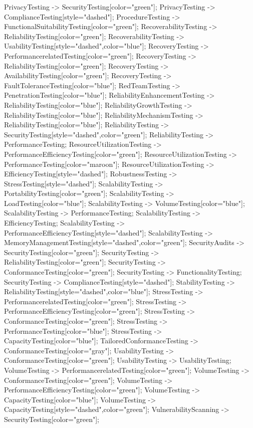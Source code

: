 \documentclass{article}
\begin{document}
{PrivacyTesting -> SecurityTesting[color="green"];
PrivacyTesting -> ComplianceTesting[style="dashed"];
ProcedureTesting -> FunctionalSuitabilityTesting[color="green"];
RecoverabilityTesting -> ReliabilityTesting[color="green"];
RecoverabilityTesting -> UsabilityTesting[style="dashed",color="blue"];
RecoveryTesting -> PerformancerelatedTesting[color="green"];
RecoveryTesting -> ReliabilityTesting[color="green"];
RecoveryTesting -> AvailabilityTesting[color="green"];
RecoveryTesting -> FaultToleranceTesting[color="blue"];
RedTeamTesting -> PenetrationTesting[color="blue"];
ReliabilityEnhancementTesting -> ReliabilityTesting[color="blue"];
ReliabilityGrowthTesting -> ReliabilityTesting[color="blue"];
ReliabilityMechanismTesting -> ReliabilityTesting[color="blue"];
ReliabilityTesting -> SecurityTesting[style="dashed",color="green"];
ReliabilityTesting -> PerformanceTesting;
ResourceUtilizationTesting -> PerformanceEfficiencyTesting[color="green"];
ResourceUtilizationTesting -> PerformanceTesting[color="maroon"];
ResourceUtilizationTesting -> EfficiencyTesting[style="dashed"];
RobustnessTesting -> StressTesting[style="dashed"];
ScalabilityTesting -> PortabilityTesting[color="green"];
ScalabilityTesting -> LoadTesting[color="blue"];
ScalabilityTesting -> VolumeTesting[color="blue"];
ScalabilityTesting -> PerformanceTesting;
ScalabilityTesting -> EfficiencyTesting;
ScalabilityTesting -> PerformanceEfficiencyTesting[style="dashed"];
ScalabilityTesting -> MemoryManagementTesting[style="dashed",color="green"];
SecurityAudits -> SecurityTesting[color="green"];
SecurityTesting -> ReliabilityTesting[color="green"];
SecurityTesting -> ConformanceTesting[color="green"];
SecurityTesting -> FunctionalityTesting;
SecurityTesting -> ComplianceTesting[style="dashed"];
StabilityTesting -> ReliabilityTesting[style="dashed",color="blue"];
StressTesting -> PerformancerelatedTesting[color="green"];
StressTesting -> PerformanceEfficiencyTesting[color="green"];
StressTesting -> ConformanceTesting[color="green"];
StressTesting -> PerformanceTesting[color="blue"];
StressTesting -> CapacityTesting[color="blue"];
TailoredConformanceTesting -> ConformanceTesting[color="gray"];
UsabilityTesting -> ConformanceTesting[color="green"];
UsabilityTesting -> UsabilityTesting;
VolumeTesting -> PerformancerelatedTesting[color="green"];
VolumeTesting -> ConformanceTesting[color="green"];
VolumeTesting -> PerformanceEfficiencyTesting[color="green"];
VolumeTesting -> CapacityTesting[color="blue"];
VolumeTesting -> CapacityTesting[style="dashed",color="green"];
VulnerabilityScanning -> SecurityTesting[color="green"];

}
\end{document}
